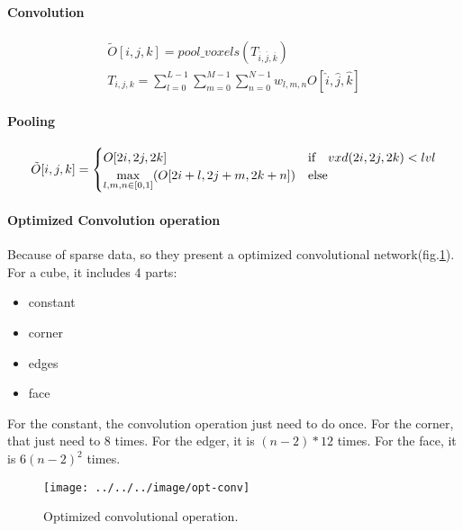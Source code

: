 \documentclass[border=0.5in]{blog}
\begin{document}
    
    \paragraph{Convolution}
        \begin{eqnarray}
        \tilde{O}[i,j,k] = pool\_voxels(T_{\overline{i},\overline{j},\overline{k}}) \\
        T_{i,j,k} = \sum\limits_{l=0}^{L-1} \sum\limits_{m=0}^{M-1} \sum\limits_{n = 0}^{N-1} w_{l,m,n} O[\hat{i},\hat{j},\hat{k}]
        \end{eqnarray}
    \paragraph{Pooling}
        \begin{equation}
        \tilde{O}[i,j,k] = \begin{cases}
        O[2i,2j,2k] & \text{if\quad} vxd(2i,2j,2k) < lvl \\
        \max\limits_{l,m,n \in \left[0,1\right]}(O[2i +l,2j +m,2k +n]) & \text{else}
        \end{cases}
        \end{equation}
    
    \paragraph{Optimized Convolution operation}
    
        Because of sparse data, so they present a optimized convolutional network(fig.\ref{fig:opt-conv}).
        For a cube, it includes 4 parts:
        \begin{itemize}
            \item constant
            \item corner
            \item edges
            \item face
        \end{itemize}
    
        For the constant, the convolution operation just need to do once.
        For the corner, that just need to 8 times.
        For the edger, it is $(n-2)*12$ times.
        For the face, it is $6(n-2)^2$ times.
        
        \begin{figure}
            \centering
            \texttt{[image: ../../../image/opt-conv]}
            \caption{Optimized convolutional operation.}
            \label{fig:opt-conv}
        \end{figure}
    
\end{document}
